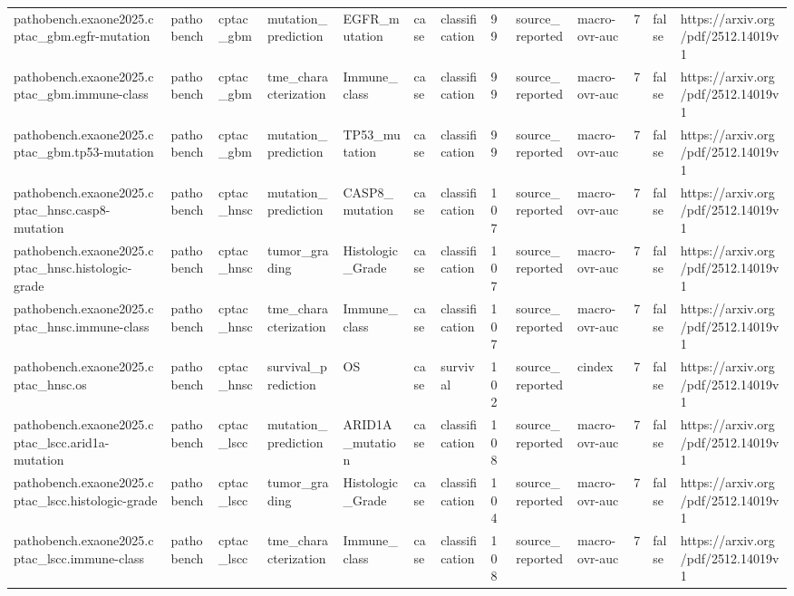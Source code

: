 \begin{longtable}{lllllllllllll}
pathobench.exaone2025.cptac\_gbm.egfr-mutation & pathobench & cptac\_gbm & mutation\_prediction & EGFR\_mutation & case & classification & 99 & source\_reported & macro-ovr-auc & 7 & false & https://arxiv.org/pdf/2512.14019v1 \\
pathobench.exaone2025.cptac\_gbm.immune-class & pathobench & cptac\_gbm & tme\_characterization & Immune\_class & case & classification & 99 & source\_reported & macro-ovr-auc & 7 & false & https://arxiv.org/pdf/2512.14019v1 \\
pathobench.exaone2025.cptac\_gbm.tp53-mutation & pathobench & cptac\_gbm & mutation\_prediction & TP53\_mutation & case & classification & 99 & source\_reported & macro-ovr-auc & 7 & false & https://arxiv.org/pdf/2512.14019v1 \\
pathobench.exaone2025.cptac\_hnsc.casp8-mutation & pathobench & cptac\_hnsc & mutation\_prediction & CASP8\_mutation & case & classification & 107 & source\_reported & macro-ovr-auc & 7 & false & https://arxiv.org/pdf/2512.14019v1 \\
pathobench.exaone2025.cptac\_hnsc.histologic-grade & pathobench & cptac\_hnsc & tumor\_grading & Histologic\_Grade & case & classification & 107 & source\_reported & macro-ovr-auc & 7 & false & https://arxiv.org/pdf/2512.14019v1 \\
pathobench.exaone2025.cptac\_hnsc.immune-class & pathobench & cptac\_hnsc & tme\_characterization & Immune\_class & case & classification & 107 & source\_reported & macro-ovr-auc & 7 & false & https://arxiv.org/pdf/2512.14019v1 \\
pathobench.exaone2025.cptac\_hnsc.os & pathobench & cptac\_hnsc & survival\_prediction & OS & case & survival & 102 & source\_reported & cindex & 7 & false & https://arxiv.org/pdf/2512.14019v1 \\
pathobench.exaone2025.cptac\_lscc.arid1a-mutation & pathobench & cptac\_lscc & mutation\_prediction & ARID1A\_mutation & case & classification & 108 & source\_reported & macro-ovr-auc & 7 & false & https://arxiv.org/pdf/2512.14019v1 \\
pathobench.exaone2025.cptac\_lscc.histologic-grade & pathobench & cptac\_lscc & tumor\_grading & Histologic\_Grade & case & classification & 104 & source\_reported & macro-ovr-auc & 7 & false & https://arxiv.org/pdf/2512.14019v1 \\
pathobench.exaone2025.cptac\_lscc.immune-class & pathobench & cptac\_lscc & tme\_characterization & Immune\_class & case & classification & 108 & source\_reported & macro-ovr-auc & 7 & false & https://arxiv.org/pdf/2512.14019v1 \\

\end{longtable}
